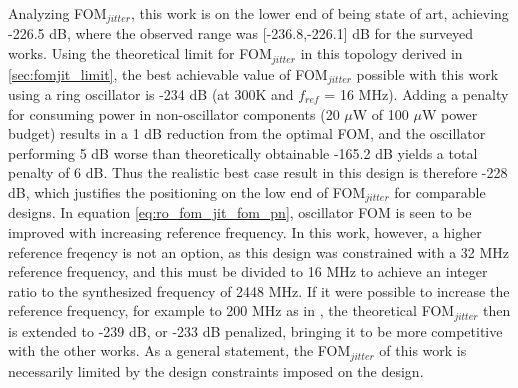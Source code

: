 Analyzing FOM$_{jitter}$, this work is on the lower end of being state of art, achieving -226.5 dB, where the observed range was [-236.8,-226.1] dB for the surveyed works. Using the theoretical limit for FOM$_{jitter}$ in this topology derived in \ref{sec:fomjit_limit}, the best achievable value of FOM$_{jitter}$ possible with this work using a ring oscillator is -234 dB (at 300K and $f_{ref}$ = 16 MHz). Adding a penalty for consuming power in non-oscillator components (20 $\mu$W of 100 $\mu$W power budget) results in a 1 dB reduction from the optimal FOM, and the oscillator performing 5 dB worse than theoretically obtainable -165.2 dB yields a total penalty of 6 dB. Thus the realistic best case result in this design is therefore -228 dB, which justifies the positioning on the low end of FOM$_{jitter}$ for comparable designs. In equation \ref{eq:ro_fom_jit_fom_pn}, oscillator FOM is seen to be improved with increasing reference frequency. In this work, however, a higher reference freqency is not an option, as this design was constrained with a 32 MHz reference frequency, and this must be divided to 16 MHz to achieve an integer ratio to the synthesized frequency of 2448 MHz. If it were possible to increase the reference frequency, for example to 200 MHz as in \cite{Xiang2020}, the theoretical FOM$_{jitter}$ then is extended to -239 dB, or -233 dB penalized, bringing it to be more competitive with the other works. As a general statement, the FOM$_{jitter}$ of this work is necessarily limited by the design constraints imposed on the design.

